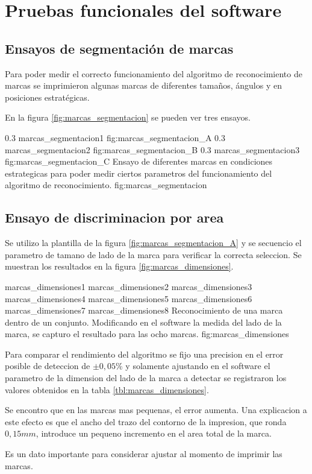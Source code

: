 \section{Pruebas funcionales del software}
\label{sec:pruebasHW}

\subsection{Ensayos de segmentación de marcas}
Para poder medir el correcto funcionamiento del algoritmo de reconocimiento de marcas se imprimieron algunas marcas de diferentes tamaños, ángulos y en posiciones estratégicas.\par
En la figura \ref{fig:marcas_segmentacion} se pueden ver tres ensayos.

   \subfigabc
   {0.3} {marcas_segmentacion1} {} {fig:marcas_segmentacion_A}
   {0.3} {marcas_segmentacion2} {} {fig:marcas_segmentacion_B}
   {0.3} {marcas_segmentacion3} {} {fig:marcas_segmentacion_C}
   {Ensayo de diferentes marcas en condiciones estrategicas para poder medir ciertos parametros del funcionamiento del algoritmo de reconocimiento.}
   {fig:marcas_segmentacion}

\subsection{Ensayo de discriminacion por area}

Se utilizo la plantilla de la figura \ref{fig:marcas_segmentacion_A} y se secuencio el parametro de tamano de lado de la marca para verificar la correcta seleccion.
Se muestran los resultados en la figura \ref{fig:marcas_dimensiones}.

\subfigfourfour
   {marcas_dimensiones1}
   {marcas_dimensiones2}
   {marcas_dimensiones3}
   {marcas_dimensiones4}
   {marcas_dimensiones5}
   {marcas_dimensiones6}
   {marcas_dimensiones7}
   {marcas_dimensiones8}
   {Reconocimiento de una marca dentro de un conjunto. Modificando en el software la medida del lado de la marca, se capturo el resultado para las ocho marcas.}
   {fig:marcas_dimensiones}

   Para comparar el rendimiento del algoritmo se fijo una precision en el error posible de deteccion de $\pm0,05$\% y solamente ajustando en el software el parametro de la dimension del lado de la marca a detectar se registraron los valores obtenidos en la tabla \ref{tbl:marcas_dimensiones}.\par

Se encontro que en las marcas mas pequenas, el error aumenta. Una explicacion a este efecto es que el ancho del trazo del contorno de la impresion, que ronda $0,15mm$, introduce un pequeno incremento en el area total de la marca. \par 
Es un dato importante para considerar ajustar al momento de imprimir las marcas.

